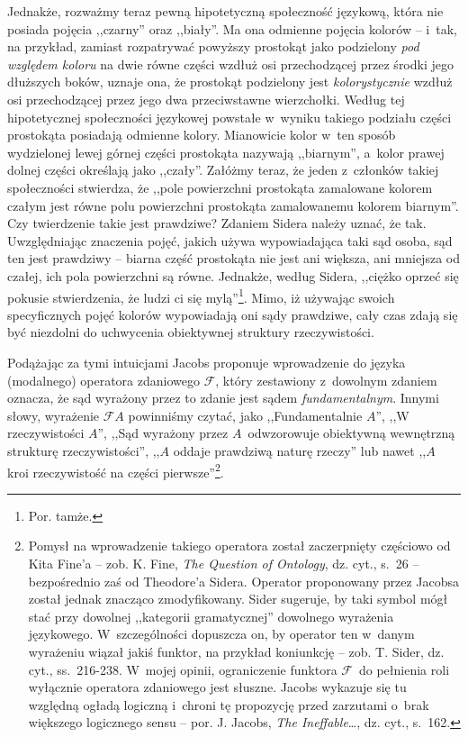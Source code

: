Jednakże, rozważmy teraz pewną hipotetyczną społeczność językową, która nie posiada pojęcia ,,czarny'' oraz ,,biały''. Ma ona odmienne pojęcia kolorów -- i~tak, na przykład, zamiast rozpatrywać powyższy prostokąt jako podzielony \textit{pod względem koloru} na dwie równe części wzdłuż osi przechodzącej przez środki jego dłuższych boków, uznaje ona, że prostokąt podzielony jest \textit{kolorystycznie} wzdłuż osi przechodzącej przez jego dwa przeciwstawne wierzchołki. Według tej hipotetycznej społeczności językowej powstałe w~wyniku takiego podziału części prostokąta posiadają odmienne kolory. Mianowicie kolor w~ten sposób wydzielonej lewej górnej części prostokąta nazywają ,,biarnym'', a~kolor prawej dolnej części określają jako ,,czały''. Załóżmy teraz, że jeden z~członków takiej społeczności stwierdza, że ,,pole powierzchni prostokąta zamalowane kolorem czałym jest równe polu powierzchni prostokąta zamalowanemu kolorem biarnym''. Czy twierdzenie takie jest prawdziwe? Zdaniem Sidera należy uznać, że tak. Uwzględniając znaczenia pojęć, jakich używa wypowiadająca taki sąd osoba, sąd ten jest prawdziwy -- biarna część prostokąta nie jest ani większa, ani mniejsza od czałej, ich pola powierzchni są równe. Jednakże, według Sidera, ,,ciężko oprzeć się pokusie stwierdzenia, że ludzi ci się mylą''\footnote{Por. tamże.}. Mimo, iż używając swoich specyficznych pojęć kolorów wypowiadają oni sądy prawdziwe, cały czas zdają się być niezdolni do uchwycenia obiektywnej struktury rzeczywistości.

Podążając za tymi intuicjami Jacobs proponuje wprowadzenie do języka (modalnego) operatora zdaniowego $\mathscr{F}$, który zestawiony z~dowolnym zdaniem oznacza, że sąd wyrażony przez to zdanie jest sądem \textit{fundamentalnym}. Innymi słowy, wyrażenie $\mathscr{F}A$ powinniśmy czytać, jako ,,Fundamentalnie $A$'', ,,W rzeczywistości $A$'', ,,Sąd wyrażony przez $A$~odwzorowuje obiektywną wewnętrzną strukturę rzeczywistości'', ,,$A$ oddaje prawdziwą naturę rzeczy'' lub nawet ,,$A$ kroi rzeczywistość na części pierwsze''\footnote{Pomysł na wprowadzenie takiego operatora został zaczerpnięty częściowo od Kita Fine'a -- zob. K. Fine, \textit{The Question of Ontology}, dz. cyt., s.~26 -- bezpośrednio zaś od Theodore'a Sidera. Operator proponowany przez Jacobsa został jednak znacząco zmodyfikowany. Sider sugeruje, by taki symbol mógł stać przy dowolnej ,,kategorii gramatycznej'' dowolnego wyrażenia językowego. W~szczególności dopuszcza on, by operator ten w~danym wyrażeniu wiązał jakiś funktor, na przykład koniunkcję -- zob. T. Sider, dz. cyt., ss.~216-238. W~mojej opinii, ograniczenie funktora $\mathscr{F}$~do pełnienia roli wyłącznie operatora zdaniowego jest słuszne. Jacobs wykazuje się tu względną ogładą logiczną i~chroni tę propozycję przed zarzutami o~brak większego logicznego sensu -- por. J. Jacobs, \textit{The Ineffable}\ldots, dz. cyt., s.~162.}.

